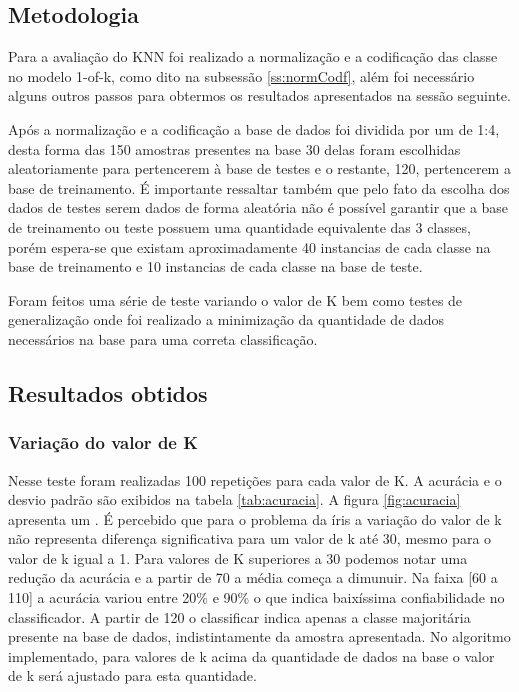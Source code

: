 \documentclass[
	article,			%
	11pt,				%
	oneside,			%
	a4paper,			%
	english,			%
	brazil,				%
	]{abntex2}
\begin{document}
\subsection{Metodologia}
\label{ss:metAplKnn}

Para a avaliação do KNN foi realizado a normalização e a codificação das classe
no modelo 1-of-k, como dito na subsessão \ref{ss:normCodf}, além foi necessário
alguns outros passos para obtermos os resultados apresentados na sessão
seguinte.

Após a normalização e a codificação a base de dados foi dividida por um  de 1:4,
desta forma das 150 amostras presentes na base 30 delas foram escolhidas
aleatoriamente para pertencerem à base de testes e o restante, 120, pertencerem
a base de treinamento. É importante ressaltar também que pelo fato da escolha
dos dados de testes serem dados de forma aleatória não é possível garantir que a
base de treinamento ou teste possuem uma quantidade equivalente das 3 classes,
porém espera-se que existam aproximadamente 40 instancias de cada classe na base
de treinamento e 10 instancias de cada classe na base de teste.

Foram feitos uma série de teste variando o valor de K bem como testes de
generalização onde foi realizado a minimização da quantidade de dados
necessários na base para uma correta classificação.

\subsection{Resultados obtidos}

\subsubsection{Variação do valor de K}
Nesse teste foram realizadas 100 repetições para cada valor de K. A acurácia e o
desvio padrão são exibidos na tabela \ref{tab:acuracia}. A figura
\ref{fig:acuracia} apresenta um . 
É percebido que para o problema da íris a variação do valor de k não representa
diferença significativa para um valor de k até 30, mesmo para o valor de k igual
a 1. Para valores de K superiores a 30 podemos notar uma redução da acurácia e a
partir de 70 a média começa a dimunuir. Na faixa [60 a 110] a acurácia variou
entre 20\% e 90\% o que indica baixíssima confiabilidade no classificador. A
partir de 120 o classificar indica apenas a classe majoritária presente na base
de dados, indistintamente da amostra apresentada. No algoritmo implementado,
para valores de k acima da quantidade de dados na base o valor de k será
ajustado para esta quantidade.
\end{document}
